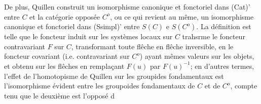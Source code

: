 De plus, Quillen construit un isomorphisme canonique et fonctoriel
dans (Cat)' entre $C$ et la catégorie opposée $C^{o}$, ou ce qui revient au
même, un isomorphisme canonique et fonctoriel dans (Ssimpl)' entre $S(C)$ e
$S(C^{o})$.  La définition est telle que le
foncteur induit sur les systèmes locaux sur $C$ trahsrme le foncteur
contravariant $F$ sur $C$, transformant toute flêche en flêche inversible, en
le foncteur covariant (i.e. contravariant sur $C^{o}$) ayant mêmes valeurs sur
les objets, et obtenu sur les flêches en remplaçant $F(u)$ par $F(u)^{-1}$; en
d'autres termes, l'effet de l'homotopisme de Quillen sur les groupides
fondamentaux est l'isomorphisme évident entre les groupoides fondamentaux
de $C$ et de $C^{o}$,  compte tenu que le deuxième est l'opposé d



